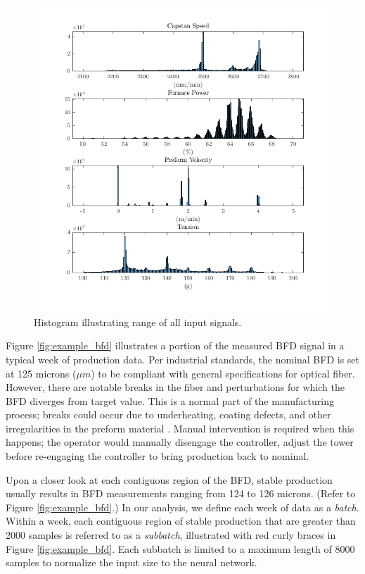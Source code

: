 \begin{figure}[t!]
    \centering
    \includegraphics[width=\textwidth]{figures/values_hist.png}
    \caption{Histogram illustrating range of all input signals.}
    \label{fig:values_hist}
\end{figure}

Figure \ref{fig:example_bfd} illustrates a portion of the measured BFD signal in a typical week of production data. Per industrial standards, the nominal BFD is set at 125 microns ($\mu m$) to be compliant with general specifications for optical fiber. However, there are notable breaks in the fiber and perturbations for which the BFD diverges from target value. This is a normal part of the manufacturing process; breaks could occur due to underheating, coating defects, and other irregularities in the preform material \cite{breaks1, breaks2}. Manual intervention is required when this happens; the operator would manually disengage the controller, adjust the tower before re-engaging the controller to bring production back to nominal. 

Upon a closer look at each contiguous region of the BFD, stable production usually results in BFD measurements ranging from 124 to 126 microns. (Refer to Figure \ref{fig:example_bfd}.) In our analysis, we define each week of data as a \emph{batch}. Within a week, each contiguous region of stable production that are greater than 2000 samples is referred to as a \emph{subbatch}, illustrated with red curly braces in Figure \ref{fig:example_bfd}. Each subbatch is limited to a maximum length of 8000 samples to normalize the input size to the neural network. 

